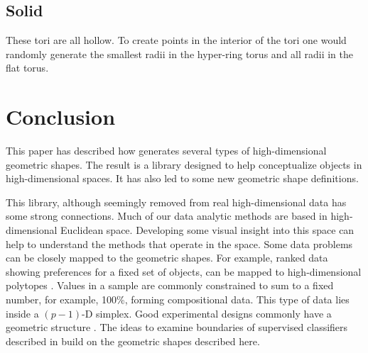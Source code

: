 


\subsection{Solid}  %

These tori are all hollow. To create points in the interior of the
tori one would randomly generate the smallest radii in the hyper-ring torus and all radii in the flat torus.

\section{Conclusion}

This paper has described how  generates several types of
high-dimensional geometric shapes. The result is a library designed to
help conceptualize objects in high-dimensional spaces. It has also led to some
new geometric shape definitions.

This library, although seemingly removed from real high-dimensional
data has some strong connections. Much of our data analytic methods
are based in high-dimensional Euclidean space. Developing some visual
insight into this space can help to understand the methods that
operate in the space. Some data problems can be closely mapped to the geometric
shapes. For example, ranked data showing preferences for a fixed set
of objects, can be mapped to high-dimensional polytopes \citep{Th93}.
Values in a sample are commonly constrained to sum to a fixed number,
for example, 100\%, forming compositional data. This type of data lies
inside a $(p - 1)$-D simplex. Good experimental designs commonly have a
geometric structure \citep{HSS99}. The ideas to examine boundaries of supervised classifiers described in \citet{CCWH08} build on the geometric shapes described here.


